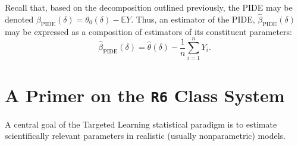 \documentclass[12pt, krantz2,]{krantz}
\newenvironment{Shaded}{\begin{snugshade}}{\end{snugshade}}
\newcommand{\CommentTok}[1]{\textcolor[rgb]{0.37,0.37,0.37}{\textit{#1}}}
\newcommand{\DataTypeTok}[1]{\textcolor[rgb]{0.27,0.27,0.27}{#1}}
\newcommand{\DecValTok}[1]{\textcolor[rgb]{0.06,0.06,0.06}{#1}}
\newcommand{\KeywordTok}[1]{\textcolor[rgb]{0.27,0.27,0.27}{\textbf{#1}}}
\newcommand{\NormalTok}[1]{#1}
\newcommand{\OperatorTok}[1]{\textcolor[rgb]{0.43,0.43,0.43}{\textbf{#1}}}
\newcommand{\OtherTok}[1]{\textcolor[rgb]{0.37,0.37,0.37}{#1}}
\newcommand{\StringTok}[1]{\textcolor[rgb]{0.5,0.5,0.5}{#1}}
\theoremstyle{definition}
\theoremstyle{definition}
\theoremstyle{definition}
\newcommand{\1}{\mathbbm{1}}
\begin{document}
\begin{Shaded}
\end{Shaded}

Recall that, based on the decomposition outlined previously, the PIDE may be
denoted \(\beta_{\text{PIDE}}(\delta) = \theta_0(\delta) - \mathbb{E}Y\). Thus, an
estimator of the PIDE, \(\hat{\beta}_{\text{PIDE}}(\delta)\) may be expressed as a
composition of estimators of its constituent parameters:
\begin{equation*}
  \hat{\beta}_{\text{PIDE}}({\delta}) = \hat{\theta}(\delta) -
  \frac{1}{n} \sum_{i = 1}^n Y_i.
\end{equation*}

\hypertarget{r6}{%
\section{\texorpdfstring{A Primer on the \texttt{R6} Class System}{A Primer on the R6 Class System}}\label{r6}}

A central goal of the Targeted Learning statistical paradigm is to estimate
scientifically relevant parameters in realistic (usually nonparametric) models.
\end{document}
